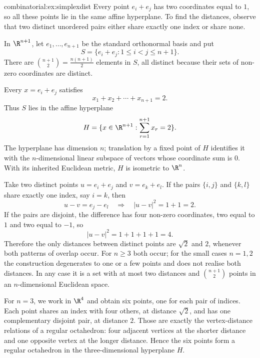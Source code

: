 \begin{solution}{combinatorial:ex:simplexdist}
\idea Every point $e_i+e_j$ has two coordinates equal to $1$, so all these points lie in the same affine hyperplane. To find the distances, observe that two distinct unordered pairs either share exactly one index or share none.

\writeup In $\R^{n+1}$, let $e_1,\ldots,e_{n+1}$ be the standard orthonormal basis and put
\[
S=\{e_i+e_j:1\le i<j\le n+1\}.
\]
There are $\binom{n+1}{2}=\frac{n(n+1)}2$ elements in $S$, all distinct because their sets of non-zero coordinates are distinct.

Every $x=e_i+e_j$ satisfies
\[
x_1+x_2+\cdots+x_{n+1}=2.
\]
Thus $S$ lies in the affine hyperplane
\[
H=\{x\in\R^{n+1}:\sum_{r=1}^{n+1}x_r=2\}.
\]
The hyperplane has dimension $n$; translation by a fixed point of $H$ identifies it with the $n$-dimensional linear subspace of vectors whose coordinate sum is $0$. With its inherited Euclidean metric, $H$ is isometric to $\R^n$.

Take two distinct points $u=e_i+e_j$ and $v=e_k+e_l$. If the pairs $\{i,j\}$ and $\{k,l\}$ share exactly one index, say $i=k$, then
\[
u-v=e_j-e_l
\quad\Longrightarrow\quad
|u-v|^2=1+1=2.
\]
If the pairs are disjoint, the difference has four non-zero coordinates, two equal to $1$ and two equal to $-1$, so
\[
|u-v|^2=1+1+1+1=4.
\]
Therefore the only distances between distinct points are $\sqrt2$ and $2$, whenever both patterns of overlap occur. For $n\ge3$ both occur; for the small cases $n=1,2$ the construction degenerates to one or a few points and does not realise both distances. In any case it is a set with at most two distances and $\binom{n+1}{2}$ points in an $n$-dimensional Euclidean space.

For $n=3$, we work in $\R^4$ and obtain six points, one for each pair of indices. Each point shares an index with four others, at distance $\sqrt2$, and has one complementary disjoint pair, at distance $2$. Those are exactly the vertex-distance relations of a regular octahedron: four adjacent vertices at the shorter distance and one opposite vertex at the longer distance. Hence the six points form a regular octahedron in the three-dimensional hyperplane $H$.
\end{solution}

